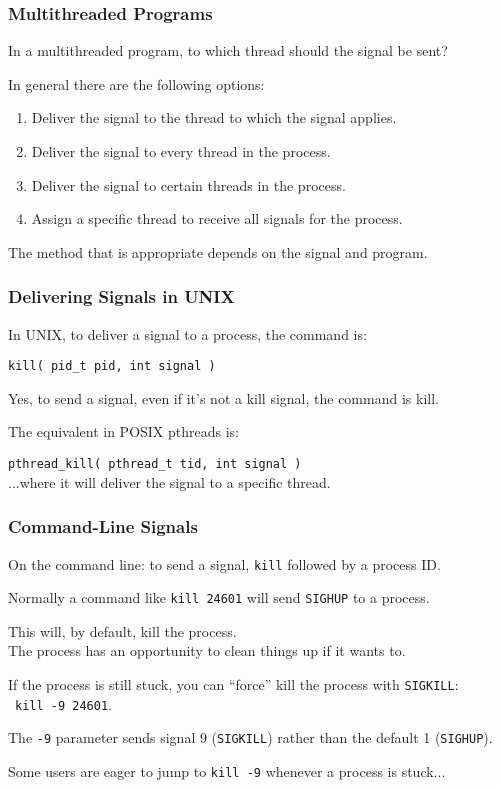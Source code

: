 \begin{frame}
\frametitle{Multithreaded Programs}

In a multithreaded program, to which thread should the signal be sent? 

In general there are the following options:
\begin{enumerate}
	\item Deliver the signal to the thread to which the signal applies.
	\item Deliver the signal to every thread in the process.
	\item Deliver the signal to certain threads in the process.
	\item Assign a specific thread to receive all signals for the process.
\end{enumerate}

The method that is appropriate depends on the signal and program.

\end{frame}



\begin{frame}
\frametitle{Delivering Signals in UNIX}

In UNIX, to deliver a signal to a process, the command is:

\texttt{kill( pid\_t pid, int signal )}

Yes, to send a signal, even if it's not a kill signal, the command is kill. 

The equivalent in POSIX pthreads is:

\texttt{pthread\_kill( pthread\_t tid, int signal )}\\
\quad ...where it will deliver the signal to a specific thread.

\end{frame}




\begin{frame}
\frametitle{Command-Line Signals}

On the command line: to send a signal, \texttt{kill} followed by a process ID. 

Normally a command like \texttt{kill 24601} will send \texttt{SIGHUP} to a process.

This will, by default, kill the process.\\
\quad The process has an opportunity to clean things up if it wants to. 

If the process is still stuck, you can ``force'' kill the process with \texttt{SIGKILL}:\\\ \quad \texttt{kill -9 24601}. 

The \texttt{-9} parameter sends signal 9 (\texttt{SIGKILL}) rather than the default 1 (\texttt{SIGHUP}). 

Some users are eager to jump to \texttt{kill -9} whenever a process is stuck...
\end{frame}

